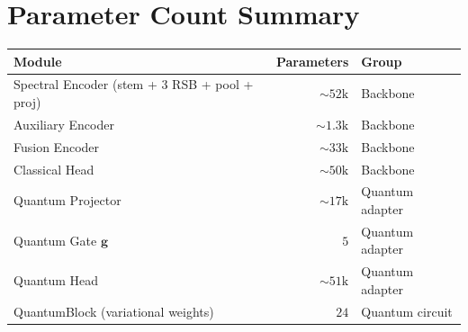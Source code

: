 \documentclass[11pt,a4paper]{article}
\begin{document}
\section{Parameter Count Summary}

\begin{center}
\begin{tabular}{l r l}
\toprule
\textbf{Module} & \textbf{Parameters} & \textbf{Group} \\
\midrule
Spectral Encoder (stem + 3 RSB + pool + proj) & ${\sim}52\text{k}$ & Backbone \\
Auxiliary Encoder & ${\sim}1.3\text{k}$ & Backbone \\
Fusion Encoder & ${\sim}33\text{k}$ & Backbone \\
Classical Head & ${\sim}50\text{k}$ & Backbone \\
\midrule
Quantum Projector & ${\sim}17\text{k}$ & Quantum adapter \\
Quantum Gate $\boldsymbol{g}$ & $5$ & Quantum adapter \\
Quantum Head & ${\sim}51\text{k}$ & Quantum adapter \\
\midrule
QuantumBlock (variational weights) & $24$ & Quantum circuit \\
\bottomrule
\end{tabular}
\end{center}
\end{document}
